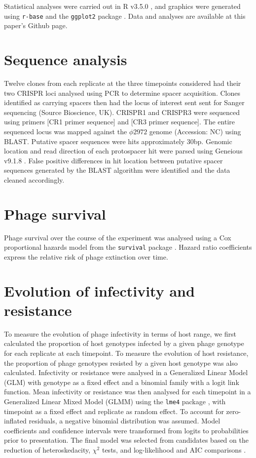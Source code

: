 \documentclass [12pt, a4paper, twoside]  {article}
\begin{document}
Statistical analyses were carried out in R v3.5.0 \citep{R}, and graphics were generated using \texttt{r-base} and the \texttt{ggplot2} package \citep{ggplot2}. Data and analyses are available at this paper's Github page.

\section*{Sequence analysis}
Twelve clones from each replicate at the three timepoints considered had their two CRISPR loci analysed using PCR to determine spacer acquisition. Clones identified as carrying spacers then had the locus of interest sent sent for Sanger sequencing (Source Bioscience, UK). CRISPR1 and CRISPR3 were sequenced using primers [CR1 primer sequence] and [CR3 primer sequence]. The entire sequenced locus was mapped against the $\phi 2972$ genome (Accession: NC) using BLAST. Putative spacer sequences were hits approximately 30bp. Genomic location and read direction of each protospacer hit were parsed using Geneious v9.1.8 \citep{kearse2012geneious}. False positive differences in hit location between putative spacer sequences generated by the BLAST algorithm were identified and the data cleaned accordingly. 

\section*{Phage survival}
Phage survival over the course of the experiment was analysed using a Cox proportional hazards model from the \texttt{survival} package \citep{survival}. Hazard ratio coefficients express the relative risk of phage extinction over time. 

\section*{Evolution of infectivity and resistance}
To measure the evolution of phage infectivity in terms of host range, we first calculated the proportion of host genotypes infected by a given phage genotype for each replicate at each timepoint. To measure the evolution of host resistance, the proportion of phage genotypes resisted by a given host genotype was also calculated. Infectivity or resistance were analysed in a Generalized Linear Model (GLM) with genotype as a fixed effect and a binomial family with a logit link function. Mean infectivity or resistance was then analysed for each timepoint in a Generalized Linear Mixed Model (GLMM) using the \texttt{lme4} package \citep{lme4}, with timepoint as a fixed effect and replicate as random effect. To account for zero-inflated residuals, a negative binomial distribution was assumed. Model coefficients and confidence intervals were transformed from logits to probabilities prior to presentation. The final model was selected from candidates based on the reduction of heteroskedacity, $\chi ^2$ tests, and log-likelihood and AIC comparisons \citep{akaike1973,burnham2003model,burnham2004aic}.
\end{document}
